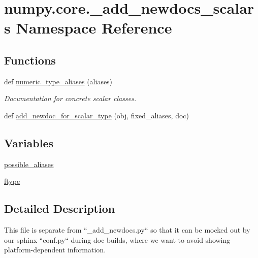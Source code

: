 \hypertarget{namespacenumpy_1_1core_1_1__add__newdocs__scalars}{}\section{numpy.\+core.\+\_\+add\+\_\+newdocs\+\_\+scalars Namespace Reference}
\label{namespacenumpy_1_1core_1_1__add__newdocs__scalars}
\subsection*{Functions}
\begin{DoxyCompactItemize}
\item 
def \hyperlink{namespacenumpy_1_1core_1_1__add__newdocs__scalars_abbc6ab31cfab8c9a89335e16761ee0ee}{numeric\+\_\+type\+\_\+aliases} (aliases)
\begin{DoxyCompactList}\small\item\em Documentation for concrete scalar classes. \end{DoxyCompactList}\item 
def \hyperlink{namespacenumpy_1_1core_1_1__add__newdocs__scalars_a2ebb240da112efe79e8195a30a427400}{add\+\_\+newdoc\+\_\+for\+\_\+scalar\+\_\+type} (obj, fixed\+\_\+aliases, doc)
\end{DoxyCompactItemize}
\subsection*{Variables}
\begin{DoxyCompactItemize}
\item 
\hyperlink{namespacenumpy_1_1core_1_1__add__newdocs__scalars_a578d52c78f13873c7d3ed9e29fff190e}{possible\+\_\+aliases}
\item 
\hyperlink{namespacenumpy_1_1core_1_1__add__newdocs__scalars_a1f12e3ed6517d47d38a9c452ea3f014c}{ftype}
\end{DoxyCompactItemize}


\subsection{Detailed Description}
\begin{DoxyVerb}This file is separate from ``_add_newdocs.py`` so that it can be mocked out by
our sphinx ``conf.py`` during doc builds, where we want to avoid showing
platform-dependent information.
\end{DoxyVerb}
 

